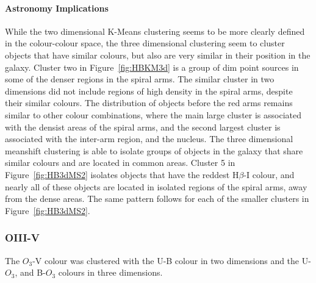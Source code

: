 \paragraph{Astronomy Implications}
While the two dimensional K-Means clustering seems to be more clearly defined in the colour-colour space, the three dimensional clustering seem to cluster objects that have similar colours, but also are very similar in their position in the galaxy.
Cluster two in Figure~\ref{fig:HBKM3d} is a group of dim point sources in some of the denser regions in the spiral arms. 
The similar cluster in two dimensions did not include regions of high density in the spiral arms, despite their similar colours.
The distribution of objects before the red arms remains similar to other colour combinations, where the main large cluster is associated with the densist areas of the spiral arms, and the second largest cluster is associated with the inter-arm region, and the nucleus.
The three dimensional meanshift clustering is able to isolate groups of objects in the galaxy that share similar colours and are located in common areas. 
Cluster 5 in Figure~\ref{fig:HB3dMS2} isolates objects that have the reddest H$\beta$-I colour, and nearly all of these objects are located in isolated regions of the spiral arms, away from the dense areas.
The same pattern follows for each of the smaller clusters in Figure~\ref{fig:HB3dMS2}.

\subsubsection{OIII-V}
The $O_{3}$-V colour was clustered with the U-B colour in two dimensions and the U-$O_{3}$, and B-$O_{3}$ colours in three dimensions.


